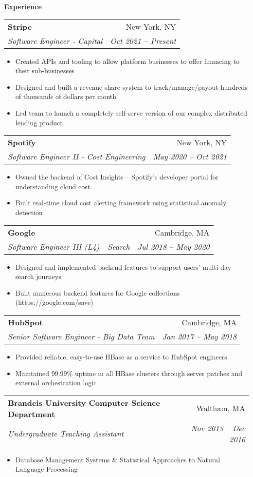 \documentclass[letterpaper,11pt]{article}
\makeatletter
\newcommand{\resitem}[1]{\item #1 \vspace{-2pt}}
\newcommand{\resheading}[1]{{\large \colorbox{mygrey}{\begin{minipage}{\textwidth}{\textbf{#1 \vphantom{p\^{E}}}}\end{minipage}}}}
\newcommand{\ressubheading}[4]{
\begin{tabular*}{6.5in}{l@{\extracolsep{\fill}}r}
		\textbf{#1} & #2 \\
		\textit{#3} & \textit{#4} \\
\end{tabular*}\vspace{-6pt}}
\makeatother
\begin{document}
\resheading{Experience}
\begin{itemize}
        \item
            \ressubheading{Stripe}{New York, NY}
            {Software Engineer - Capital}{Oct 2021 -- Present}
	      {\footnotesize
	      	\begin{itemize}
	      		\resitem{Created APIs and tooling to allow platform businesses to offer financing to their sub-businesses}
	      		\resitem{Designed and built a revenue share system to track/manage/payout hundreds of thousands of dollars per month}
                        \resitem{Led team to launch a completely self-serve version of our complex distributed lending product}
                         
                        
	      	\end{itemize}
	\item
	      \ressubheading{Spotify}{New York, NY}
	      {Software Engineer II - Cost Engineering}{May 2020 -- Oct 2021}
	      {\footnotesize
	      	\begin{itemize}
	      		\resitem{Owned the backend of Cost Insights -- Spotify's developer portal for understanding cloud cost}
	      		\resitem{Built real-time cloud cost alerting framework using statistical anomaly detection}
	      	\end{itemize}
	      }
	\item
	      \ressubheading{Google}{Cambridge, MA}
	      {Software Engineer III (L4) - Search}{Jul 2018 -- May 2020}
	      {\footnotesize
	      	\begin{itemize}
	      		\resitem{Designed and implemented backend features to support users' multi-day search journeys}
	      		\resitem{Built numerous backend features for Google collections (https://google.com/save)}
	      	\end{itemize}
	      }
	\item
	      \ressubheading{HubSpot}{Cambridge, MA}
	      {Senior Software Engineer - Big Data Team}{Jan 2017 -- May 2018}
	      {\footnotesize
	      	\begin{itemize}
	      		\resitem{Provided reliable, easy-to-use HBase as a service to HubSpot engineers}
	      		\resitem{Maintained 99.99\% uptime in all HBase clusters through server patches and external orchestration logic}
	      	\end{itemize}
	      }
	\item
	      \ressubheading{Brandeis University Computer Science Department}{Waltham, MA}
	      {Undergraduate Teaching Assistant}{Nov 2013 -- Dec 2016}
	      {\footnotesize
	      	\begin{itemize}
	      		\resitem{Database Management Systems \& Statistical Approaches to Natural Language Processing}
	      	\end{itemize}
	      }
	      
}
\end{itemize}
\end{document}
